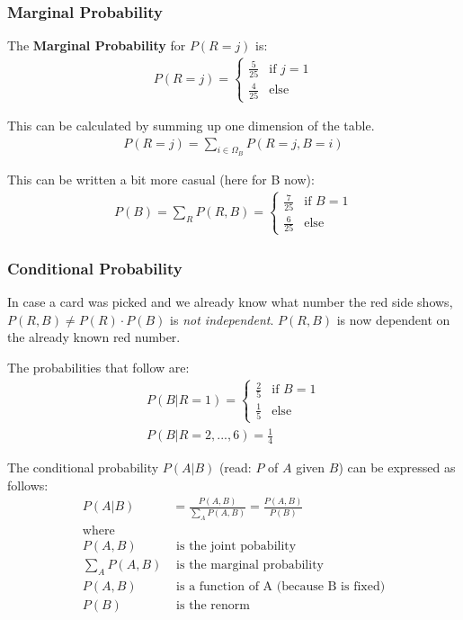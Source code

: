 \documentclass[../main/Notes.tex]{subfiles}
\begin{document}
\subsubsection*{Marginal Probability}
The \textbf{Marginal Probability} for $P(R=j)$ is:
\begin{align*}
P(R=j) = 
\begin{cases} 
\frac{5}{25} & \mbox{if } j = 1 \\ 
\frac{4}{25} & \mbox{else}
\end{cases}
\end{align*}

This can be calculated by summing up one dimension of the table.
\begin{align*}
P(R=j) = \sum\limits_{i \in \Omega_B} P(R=j, B=i)
\end{align*}

This can be written a bit more casual (here for B now):
\begin{align*}
P(B) = \sum\limits_R P(R, B) = 
\begin{cases} 
\frac{7}{25} & \mbox{if } B = 1 \\ 
\frac{6}{25} & \mbox{else}
\end{cases}
\end{align*}

\subsubsection*{Conditional Probability}
In case a card was picked and we already know what number the red side shows,
$P(R, B) \neq P(R) \cdot P(B)$ is \textit{not independent}. $P(R,B)$ is now dependent on the already known red number.

The probabilities that follow are:
\begin{align*}
P(B|R=1) =
\begin{cases} 
\frac{2}{5} & \mbox{if } B = 1 \\ 
\frac{1}{5} & \mbox{else}
\end{cases}\\
P(B|R=2, ..., 6) = \frac{1}{4}
\end{align*}

The conditional probability $P(A|B)$ (read: $P$ of $A$ given $B$) can be expressed as follows:
\begin{align*}
P(A|B)         &= \frac{P(A, B)}{\sum\limits_A P(A, B)} = \frac{P(A, B)}{P(B)} \\
\mbox{where}   & \\
P(A, B)        &\mbox{ is the joint pobability} \\
\sum\limits_A P(A, B) &\mbox{ is the marginal probability} \\
P(A, B)        &\mbox{ is a function of A (because B is fixed)}\\
P(B)           &\mbox{ is the renorm}
\end{align*}
\end{document}
